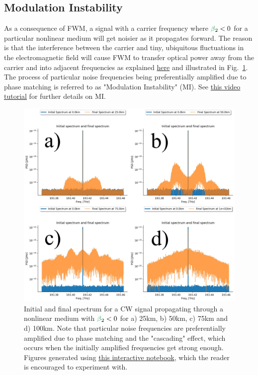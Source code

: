 \subsection{Modulation Instability}
As a consequence of FWM, a signal with a carrier frequency where $\betag_2<0$ for a particular nonlinear medium will get noisier as it propagates forward. The reason is that the interference between the carrier and tiny, ubiquitous fluctuations in the electromagnetic field will cause FWM to transfer optical power away from the carrier and into adjacent frequencies as explained \href{https://prefetch.eu/know/concept/modulational-instability/}{here} and illustrated in Fig.~\ref{fig:MI}. The process of particular noise frequencies being preferentially amplified due to phase matching is referred to as "Modulation Instability" (MI). See \href{https://youtu.be/VtaoPd0Fwj8}{this video tutorial} for further details on MI. 

\begin{figure}
    \centering
    \includegraphics[width=1\linewidth]{figures/MI_combined.png}
    \caption{Initial and final spectrum for a CW signal propagating through a nonlinear medium with $\betag_2<0$ for a) 25km, b) 50km, c) 75km and d) 100km. Note that particular noise frequencies are preferentially amplified due to phase matching and the "cascading" effect, which occurs when the initially amplified frequencies get strong enough. Figures generated using \href{https://colab.research.google.com/drive/1p2aQZ4zPPAIMplVxvlezdmpQt_j-rsY7?usp=sharing}{this interactive notebook}, which the reader is encouraged to experiment with.}
    \label{fig:MI}
\end{figure}



